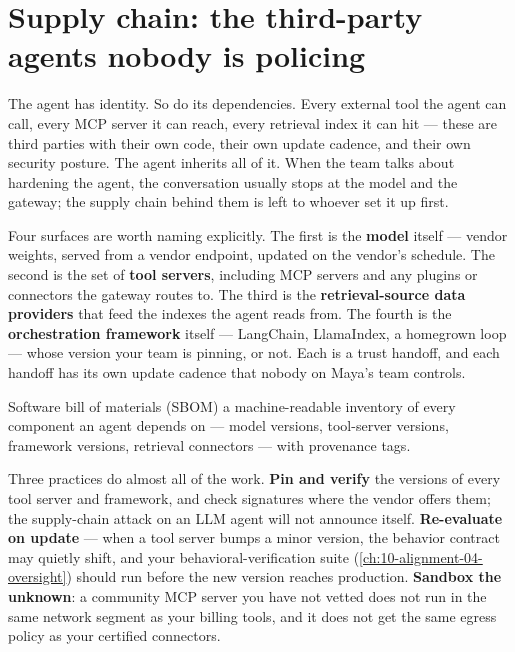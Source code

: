\section{Supply chain: the third-party agents nobody is policing}

The agent has identity. So do its dependencies. Every external tool the agent can call, every MCP server it can reach, every retrieval index it can hit --- these are third parties with their own code, their own update cadence, and their own security posture. The agent inherits all of it. When the team talks about hardening the agent, the conversation usually stops at the model and the gateway; the supply chain behind them is left to whoever set it up first.

Four surfaces are worth naming explicitly. The first is the \textbf{model} itself --- vendor weights, served from a vendor endpoint, updated on the vendor's schedule. The second is the set of \textbf{tool servers}, including MCP servers and any plugins or connectors the gateway routes to. The third is the \textbf{retrieval-source data providers} that feed the indexes the agent reads from. The fourth is the \textbf{orchestration framework} itself --- LangChain, LlamaIndex, a homegrown loop --- whose version your team is pinning, or not. Each is a trust handoff, and each handoff has its own update cadence that nobody on Maya's team controls.

\begin{TNdefinition}{Software bill of materials (SBOM)} a machine-readable inventory of every component an agent depends on --- model versions, tool-server versions, framework versions, retrieval connectors --- with provenance tags.\end{TNdefinition}

Three practices do almost all of the work. \textbf{Pin and verify} the versions of every tool server and framework, and check signatures where the vendor offers them; the supply-chain attack on an LLM agent will not announce itself. \textbf{Re-evaluate on update} --- when a tool server bumps a minor version, the behavior contract may quietly shift, and your behavioral-verification suite (\autoref{ch:10-alignment-04-oversight}) should run before the new version reaches production. \textbf{Sandbox the unknown}: a community MCP server you have not vetted does not run in the same network segment as your billing tools, and it does not get the same egress policy as your certified connectors.

